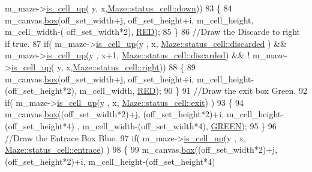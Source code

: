 \begin{DoxyCode}
      m\_maze->\hyperlink{classMaze_a2b0e69e72d6c3e1037578f057946a21e}{is\_cell\_up}( y, x,\hyperlink{classMaze_a07167e321eac2b67100fb82ecb98f1d1a74e8333ad11685ff3bdae589c8f6e34d}{Maze::status\_cell::down}))
83             \{
84                 m\_canvas.\hyperlink{classCanvas_a6e1c6baa6fb92cd3de1726b67b51aa38}{box}(off\_set\_width+j, off\_set\_height+i, m\_cell\_height, m\_cell\_width-(
      off\_set\_width*2), \hyperlink{render_8cpp_a0db58550f21b0b45458ade7d071c3500}{RED});         
85             \}
86             \textcolor{comment}{//Draw the Discarde to right if true.}
87             \textcolor{keywordflow}{if}( m\_maze->\hyperlink{classMaze_a2b0e69e72d6c3e1037578f057946a21e}{is\_cell\_up}(y , x, \hyperlink{classMaze_a07167e321eac2b67100fb82ecb98f1d1a94708897ec9db8647dfe695714c98e46}{Maze::status\_cell::discarded}
      ) &&  m\_maze->\hyperlink{classMaze_a2b0e69e72d6c3e1037578f057946a21e}{is\_cell\_up}(y , x+1, \hyperlink{classMaze_a07167e321eac2b67100fb82ecb98f1d1a94708897ec9db8647dfe695714c98e46}{Maze::status\_cell::discarded}) && !
      m\_maze->\hyperlink{classMaze_a2b0e69e72d6c3e1037578f057946a21e}{is\_cell\_up}( y, x,\hyperlink{classMaze_a07167e321eac2b67100fb82ecb98f1d1a7c4f29407893c334a6cb7a87bf045c0d}{Maze::status\_cell::right}))
88             \{
89                 m\_canvas.\hyperlink{classCanvas_a6e1c6baa6fb92cd3de1726b67b51aa38}{box}(off\_set\_width+j, off\_set\_height+i, m\_cell\_height-(off\_set\_height*2), 
      m\_cell\_width, \hyperlink{render_8cpp_a0db58550f21b0b45458ade7d071c3500}{RED});         
90             \}
91             \textcolor{comment}{//Draw the exit box Green.}
92             \textcolor{keywordflow}{if}( m\_maze->\hyperlink{classMaze_a2b0e69e72d6c3e1037578f057946a21e}{is\_cell\_up}(y , x, \hyperlink{classMaze_a07167e321eac2b67100fb82ecb98f1d1af24f62eeb789199b9b2e467df3b1876b}{Maze::status\_cell::exit}) )
93             \{
94                 m\_canvas.\hyperlink{classCanvas_a6e1c6baa6fb92cd3de1726b67b51aa38}{box}((off\_set\_width*2)+j, (off\_set\_height*2)+i, m\_cell\_height-(off\_set\_height*4)
      , m\_cell\_width-(off\_set\_width*4), \hyperlink{render_8cpp_a58d827358f6165cc5927d28b2dcff311}{GREEN});         
95             \}
96             \textcolor{comment}{//Draw the Entrace Box Blue.}
97             \textcolor{keywordflow}{if}( m\_maze->\hyperlink{classMaze_a2b0e69e72d6c3e1037578f057946a21e}{is\_cell\_up}(y , x, \hyperlink{classMaze_a07167e321eac2b67100fb82ecb98f1d1a31f57c97180bdc320a97370c71cf524a}{Maze::status\_cell::entrace}) )
98             \{
99                 m\_canvas.\hyperlink{classCanvas_a6e1c6baa6fb92cd3de1726b67b51aa38}{box}((off\_set\_width*2)+j, (off\_set\_height*2)+i, m\_cell\_height-(off\_set\_height*4)

\end{DoxyCode}

